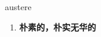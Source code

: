 
\begin{frame}
{\huge austere}
\begin{center}
\begin{enumerate}\Large
  \item \textbf{朴素的，朴实无华的}
\end{enumerate}
\end{center}
\end{frame}
